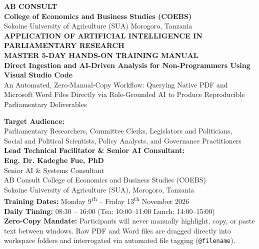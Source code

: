 \documentclass[11pt, a4paper]{report}
\begin{document}
\begin{titlepage}
    \centering
    \vspace*{0.5cm}
    
    {\LARGE \textbf{\textcolor{tanzaniablue}{AB CONSULT}}}\\[0.2cm]
    {\large \textbf{College of Economics and Business Studies (COEBS)}}\\[0.15cm]
    {\normalsize Sokoine University of Agriculture (SUA) \textbullet{} Morogoro, Tanzania}\\[1.2cm]
    
    {\LARGE \textbf{\textcolor{suagreen}{APPLICATION OF ARTIFICIAL INTELLIGENCE IN PARLIAMENTARY RESEARCH}}}\\[0.4cm]
    {\Huge \textbf{MASTER 5-DAY HANDS-ON TRAINING MANUAL}}\\[0.4cm]
    {\Large \textbf{Direct Ingestion and AI-Driven Analysis for Non-Programmers Using Visual Studio Code}}\\[0.25cm]
    {\large An Automated, Zero-Manual-Copy Workflow: Querying Native PDF and Microsoft Word Files Directly via Role-Grounded AI to Produce Reproducible Parliamentary Deliverables}\\[1.2cm]
    
    \begin{minipage}{0.94\textwidth}
        \centering
        \textbf{Target Audience:}\\
        Parliamentary Researchers, Committee Clerks, Legislators and Politicians,\\
        Social and Political Scientists, Policy Analysts, and Governance Practitioners\\[0.6cm]
        
        \textbf{Lead Technical Facilitator \& Senior AI Consultant:}\\
        \textbf{\Large Eng. Dr. Kadeghe Fue, PhD}\\
        Senior AI \& Systems Consultant\\
        AB Consult \textbullet{} College of Economics and Business Studies (COEBS)\\
        Sokoine University of Agriculture (SUA), Morogoro, Tanzania\\[0.6cm]
        
        \textbf{Training Dates:} Monday 9\textsuperscript{th} -- Friday 13\textsuperscript{th} November 2026\\
        \textbf{Daily Timing:} 08:30 -- 16:00 (Tea: 10:00--11:00 \textbar{} Lunch: 14:00--15:00)\\
        \textbf{Zero-Copy Mandate:} Participants will never manually highlight, copy, or paste text between windows. Raw PDF and Word files are dragged directly into workspace folders and interrogated via automated file tagging (\texttt{@filename}).
    \end{minipage}
    

\end{titlepage}
\end{document}
